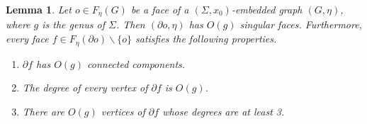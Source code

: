 \documentclass[a4paper,11pt]{article}
\newtheorem{lemma}{Lemma}
\numberwithin{lemma}{section}
\begin{document}
\begin{lemma}\label{lem-degree}
 Let $o \in F_\eta(G)$ be a face of a $(\varSigma,x_0)$-embedded graph $(G,\eta)$, where $g$ is the genus of $\varSigma$.
 Then $(\partial o,\eta)$ has $O(g)$ singular faces.
 Furthermore, every face $f \in F_\eta(\partial o) \backslash \{o\}$ satisfies the following properties.
 \begin{enumerate}[label = (\arabic*)]
  \item\label{item:degree-1} $\partial f$ has $O(g)$ connected components.
  \item\label{item:degree-2} The degree of every vertex of $\partial f$ is $O(g)$.
  \item\label{item:degree-3} There are $O(g)$ vertices of $\partial f$ whose degrees are at least 3.
 \end{enumerate}
\end{lemma}
\end{document}
